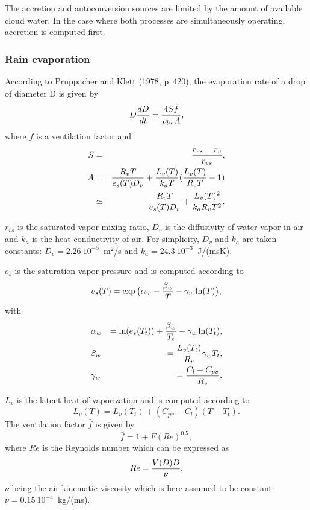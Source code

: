 The accretion and autoconversion sources are limited by the amount of available
cloud water. In the case where both processes are simultaneously operating,
accretion is computed first.

\subsubsection{Rain evaporation}
According to Pruppacher and Klett (1978, p~420), the evaporation rate of a drop
of diameter D is given by
\begin{equation}
D {dD \over dt} = {4S \bar f \over \rho_{lw} A}, \label{eq17}
\end{equation}
where $\bar f$ is a ventilation factor and
\begin{eqnarray}
S&=& {r_{vs}-r_v \over r_{vs}}, \\
A&=& {R_v T \over e_s(T) D_v} + {L_v(T) \over k_a T}({L_v(T) \over R_v T} -1)\\
 &\simeq &{R_v T \over e_s(T) D_v} + {L_v(T)^2 \over k_a R_v T^2}  .
\end{eqnarray}

$r_{vs}$ is the saturated vapor mixing ratio, $D_v$ is the diffusivity of water
vapor in air and $k_a$ is the heat conductivity of air.
For simplicity, $D_v$ and  $k_a$ are taken constants:
$D_v=2.26\ 10^{-5}$~m$^2$/s and $k_a= 24.3 \ 10 ^{-3}$~J/(msK).

$e_s$ is the saturation vapor pressure and is computed according to
\begin{equation}
\label{eq21}
e_s(T)= \exp \big( \alpha_w - {\beta_w \over T} - \gamma_w \ln (T) \big),
\end{equation}
with
\begin{eqnarray}
&\alpha_w   &= \ln (e_s(T_t))+{\beta_w \over T_t} - \gamma_w \ln (T_t), \\
&\beta_w   &= {L_v(T_t) \over R_v}\gamma_w T_t, \\
&\gamma_w  &= {C_l -C_{pv} \over R_v}.
\end{eqnarray}

$L_v$ is the latent heat of vaporization and is computed according to
\begin{equation}
L_v(T) = L_v(T_t) + (C_{pv} - C_l)(T-T_t).
\end{equation}
The ventilation factor $\bar f$ is given by
\begin{equation}
\bar f = 1 + F (Re) ^{0.5},\label{eq26}
\end{equation}
where $Re$ is the Reynolds number which can be expressed as
\begin{equation}
Re= {V(D) D \over \nu}, \label{eq27}
\end{equation}
$\nu$  being  the air kinematic viscosity which is here assumed to be constant:
$\nu=0.15 \ 10^{-4}$~kg/(ms).

